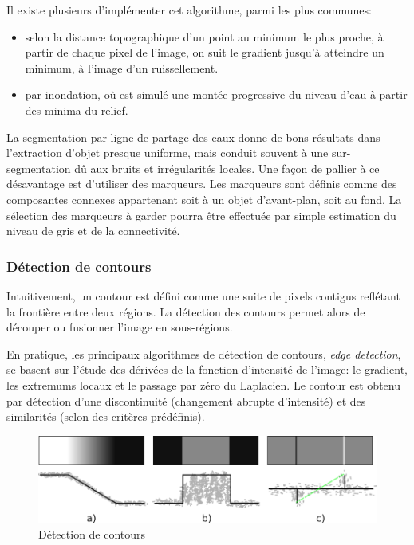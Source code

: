 \documentclass[a4paper,11pt]{report}
\begin{document}
Il existe plusieurs d'implémenter cet algorithme, parmi les plus communes: 
\begin{itemize}
\item selon la distance topographique d'un point au minimum le plus proche, à partir de chaque pixel de l'image, on suit le gradient jusqu'à atteindre un minimum, à l'image d'un ruissellement.
\item par inondation, où est simulé une montée progressive du niveau d'eau à partir des minima du relief.\\
\end{itemize}

La segmentation par ligne de partage des eaux donne de bons résultats dans l'extraction d'objet presque uniforme, mais conduit souvent à une sur-segmentation dû aux bruits et irrégularités locales. Une façon de pallier à ce désavantage est d'utiliser des marqueurs. Les marqueurs sont définis comme des composantes connexes appartenant soit à un objet d'avant-plan, soit au fond. La sélection des marqueurs à garder pourra être effectuée par simple estimation du niveau de gris et de la connectivité.%


\subsubsection{Détection de contours}
Intuitivement, un contour est défini comme une suite de pixels contigus reflétant la frontière entre deux régions. 
La détection des contours permet alors de découper ou fusionner l'image en sous-régions.

En pratique, les principaux algorithmes de détection de contours, \textit{edge detection}, se basent sur l'étude des dérivées de la fonction d'intensité de l'image: le gradient, les extremums locaux et le passage par zéro du Laplacien. Le contour est obtenu par détection d'une discontinuité (changement abrupte d'intensité) et des similarités (selon des critères prédéfinis).\\

\begin{figure}[hbtp]
\centering
\includegraphics[scale=0.6]{figureDetectionDiscontinuities.png}
\caption{Détection de contours}
\label{fig:DetectionDiscontinuities}
\end{figure}
\end{document}
